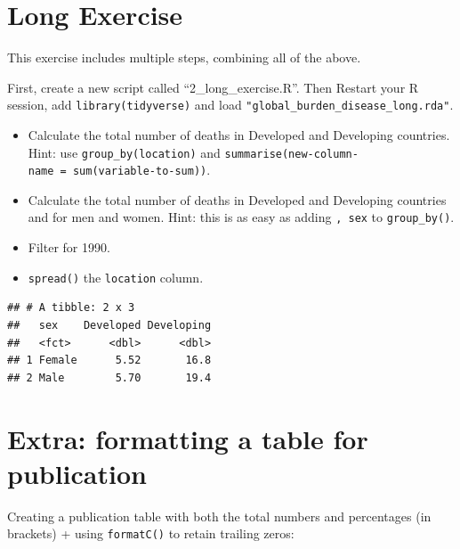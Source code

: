 \documentclass[12pt,]{krantz}
\providecommand{\tightlist}{%
  \setlength{\itemsep}{0pt}\setlength{\parskip}{0pt}}
\theoremstyle{definition}
\theoremstyle{definition}
\theoremstyle{definition}
\theoremstyle{remark}
\begin{document}
\newpage

\hypertarget{long-exercise}{%
\section{Long Exercise}\label{long-exercise}}

This exercise includes multiple steps, combining all of the above.

First, create a new script called ``2\_long\_exercise.R''. Then Restart
your R session, add \texttt{library(tidyverse)} and load
\texttt{"global\_burden\_disease\_long.rda"}.

\begin{itemize}
\tightlist
\item
  Calculate the total number of deaths in Developed and Developing
  countries. Hint: use \texttt{group\_by(location)} and
  \texttt{summarise(new-column-name\ =\ sum(variable-to-sum))}.
\item
  Calculate the total number of deaths in Developed and Developing
  countries and for men and women. Hint: this is as easy as adding
  \texttt{,\ sex} to \texttt{group\_by()}.
\item
  Filter for 1990.
\item
  \texttt{spread()} the \texttt{location} column.
\end{itemize}

\begin{verbatim}
## # A tibble: 2 x 3
##   sex    Developed Developing
##   <fct>      <dbl>      <dbl>
## 1 Female      5.52       16.8
## 2 Male        5.70       19.4
\end{verbatim}

\hypertarget{extra-formatting-a-table-for-publication}{%
\section{Extra: formatting a table for
publication}\label{extra-formatting-a-table-for-publication}}

Creating a publication table with both the total numbers and percentages
(in brackets) + using \texttt{formatC()} to retain trailing zeros:
\end{document}
